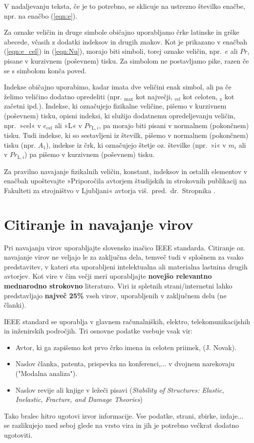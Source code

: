 V nadaljevanju teksta, če je to potrebno, se sklicuje na ustrezno številko enačbe, npr. na enačbo (\ref{eqn:e}).

Za oznake veličin in druge simbole običajno uporabljamo črke latinske in grške abecede, včasih z dodatki indeksov in drugih znakov. Kot je prikazano v enačbah (\ref{eqn:e_cel}) in (\ref{eqn:Nu}), morajo biti simboli, torej oznake veličin, npr.\ $e$ ali $Pr$, pisane v kurzivnem (poševnem) tisku. Za simbolom ne postavljamo pike, razen če se s simbolom konča poved.

Indekse običajno uporabimo, kadar imata dve veličini enak simbol, ali pa če želimo veličino dodatno opredeliti (npr. $_{\text{max}}$ kot največji, $_{\text{cel}}$ kot celoten, $_{\text{z}}$ kot začetni ipd.). Indekse, ki označujejo fizikalne veličine, pišemo v kurzivnem (poševnem) tisku, opisni indeksi, ki služijo dodatnemu opredeljevanju veličin, npr.\ »cel« v $e_{\text{cel}}$ ali »L« v $Pr_{\text{L},i}$, pa morajo biti pisani v normalnem (pokončnem) tisku. Tudi indekse, ki so sestavljeni iz številk, pišemo v normalnem (pokončnem) tisku (npr. $A_1$), indekse iz črk, ki označujejo štetje oz. številke (npr.\ »i« v $m_i$ ali v $Pr_{\text{L},i}$) pa pišemo v kurzivnem (poševnem) tisku.

Za pravilno navajanje fizikalnih veličin, konstant, indeksov in ostalih elementov v enačbah upoštevajte »Priporočila avtorjem študijskih in strokovnih publikacij na Fakulteti za strojništvo v Ljubljani« avtorja viš.\ pred.\ dr.\ Stropnika \cite{stropnik_1997}.

\section{Citiranje in navajanje virov}\label{sec:citiranje}

Pri navajanju virov uporabljajte slovensko inačico IEEE standarda. Citiranje 
oz. navajanje virov ne veljajo le za zaključna dela, temveč tudi v splošnem za 
vsako predstavitev, v kateri sta uporabljeni intelektualna ali materialna 
lastnina drugih avtorjev. Kot vire v čim večji meri uporabljajte 
\textbf{novejšo relevantno mednarodno strokovno} literaturo. Viri iz spletnih 
strani/internetni lahko predstavljajo \textbf{največ 25\%} vseh virov, 
uporabljenih v zaključnem delu (ne članki).

IEEE standard se uporablja v glavnem računalniških, elektro, 
telekomunikacijshih in inženirskih področjih. Tri osnovne podatke vsebuje vsak 
vir:
\begin{itemize}
	\item Avtor, ki ga zapišemo kot prvo črko imena in celoten priimek, (J. 
	Novak).
	\item Naslov članka, patenta, prispevka na konferenci,...  v dvojnem 
	narekovaju ("Modalna analiza").
	\item Naslov revije ali knjige v ležeči pisavi (\emph{Stability of 
		Structures: Elastic, Inelastic, Fracture, and Damage Theories})
\end{itemize}
Tako bralec hitro ugotovi izvor informacije. Vse podatke, strani, zbirke, 
izdaje...  se razlikujejo med seboj glede na vrsto vira in jih je potrebno 
večkrat dodatno ugotoviti. 

